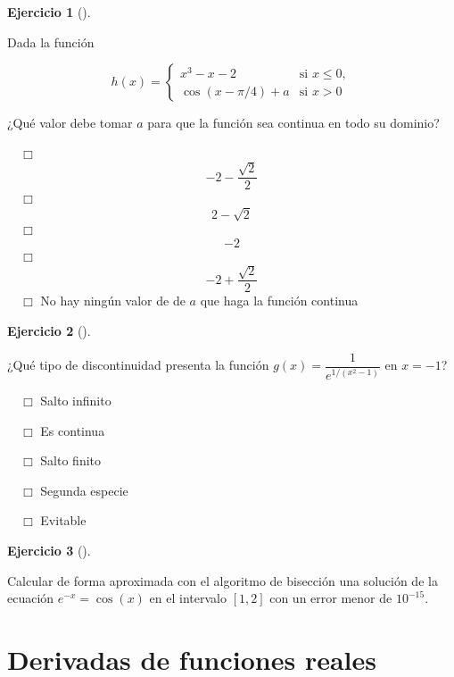 \documentclass[
  a4paper,
]{scrreport}
\theoremstyle{definition}
\newtheorem{exercise}{Ejercicio}[chapter]
\theoremstyle{remark}
\begin{document}
\begin{exercise}[]\protect\hypertarget{exr-continuidad-2}{}\label{exr-continuidad-2}

Dada la función

\[
h(x)=
\begin{cases}
x^3-x-2 & \mbox{si } x\leq 0,\\
\cos(x-\pi/4)+a & \mbox{si } x>0
\end{cases}
\]

¿Qué valor debe tomar \(a\) para que la función sea continua en todo su
dominio?

${\quad\Box}$ $$-2 - \frac{\sqrt{2}}{2}$$
${\quad\Box}$ $$2-\sqrt{2}$$
${\quad\Box}$ $$-2$$
${\quad\Box}$ $$-2+\frac{\sqrt{2}}{2}$$
${\quad\Box}$ No hay ningún valor de de $a$ que haga la función continua

\end{exercise}

\begin{exercise}[]\protect\hypertarget{exr-clasificacion-discontinuidad}{}\label{exr-clasificacion-discontinuidad}

¿Qué tipo de discontinuidad presenta la función
\(g(x)=\dfrac{1}{e^{1/(x^2-1)}}\) en \(x=-1\)?

${\quad\Box}$ Salto infinito

${\quad\Box}$ Es continua

${\quad\Box}$ Salto finito

${\quad\Box}$ Segunda especie

${\quad\Box}$ Evitable

\end{exercise}

\begin{exercise}[]\protect\hypertarget{exr-raices}{}\label{exr-raices}

Calcular de forma aproximada con el algoritmo de bisección una solución
de la ecuación \(e^{-x}=\cos(x)\) en el intervalo \([1,2]\) con un error
menor de \(10^{-15}\).

\vspace{18pt}

\end{exercise}


\chapter{Derivadas de funciones
reales}\label{derivadas-de-funciones-reales}
\end{document}
